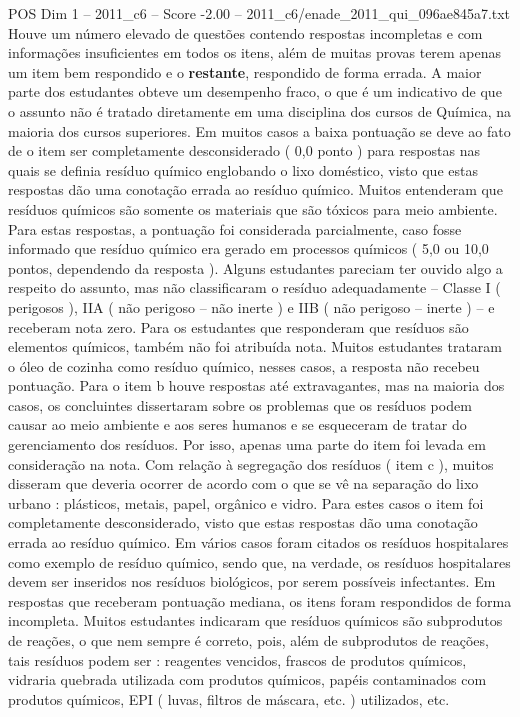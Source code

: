 \begin{textsample}{POS Dim 1 – 2011\_c6 – Score -2.00 – 2011\_c6/enade\_2011\_qui\_096ae845a7.txt}
Houve um número elevado de questões contendo respostas incompletas e com informações insuficientes em todos os itens, além de muitas provas terem apenas um item bem respondido e o \textbf{restante}, respondido de forma errada.
A maior parte dos estudantes obteve um desempenho fraco, o que é um indicativo de que o assunto não é tratado diretamente em uma disciplina dos cursos de Química, na maioria dos cursos superiores.
Em muitos casos a baixa pontuação se deve ao fato de o item ser completamente desconsiderado ( 0,0 ponto ) para respostas nas quais se definia resíduo químico englobando o lixo doméstico, visto que estas respostas dão uma conotação errada ao resíduo químico.
Muitos entenderam que resíduos químicos são somente os materiais que são tóxicos para meio ambiente.
Para estas respostas, a pontuação foi considerada parcialmente, caso fosse informado que resíduo químico era gerado em processos químicos ( 5,0 ou 10,0 pontos, dependendo da resposta ).
Alguns estudantes pareciam ter ouvido algo a respeito do assunto, mas não classificaram o resíduo adequadamente – Classe I ( perigosos ), IIA ( não perigoso – não inerte ) e IIB ( não perigoso – inerte ) – e receberam nota zero.
Para os estudantes que responderam que resíduos são elementos químicos, também não foi atribuída nota.
Muitos estudantes trataram o óleo de cozinha como resíduo químico, nesses casos, a resposta não recebeu pontuação.
Para o item b houve respostas até extravagantes, mas na maioria dos casos, os concluintes dissertaram sobre os problemas que os resíduos podem causar ao meio ambiente e aos seres humanos e se esqueceram de tratar do gerenciamento dos resíduos.
Por isso, apenas uma parte do item foi levada em consideração na nota.
Com relação à segregação dos resíduos ( item c ), muitos disseram que deveria ocorrer de acordo com o que se vê na separação do lixo urbano : plásticos, metais, papel, orgânico e vidro.
Para estes casos o item foi completamente desconsiderado, visto que estas respostas dão uma conotação errada ao resíduo químico.
Em vários casos foram citados os resíduos hospitalares como exemplo de resíduo químico, sendo que, na verdade, os resíduos hospitalares devem ser inseridos nos resíduos biológicos, por serem possíveis infectantes.
Em respostas que receberam pontuação mediana, os itens foram respondidos de forma incompleta.
Muitos estudantes indicaram que resíduos químicos são subprodutos de reações, o que nem sempre é correto, pois, além de subprodutos de reações, tais resíduos podem ser : reagentes vencidos, frascos de produtos químicos, vidraria quebrada utilizada com produtos químicos, papéis contaminados com produtos químicos, EPI ( luvas, filtros de máscara, etc. ) utilizados, etc.

\end{textsample}
